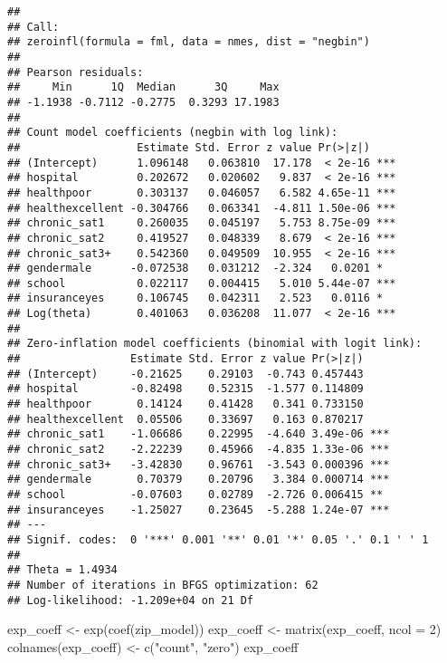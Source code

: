 \documentclass[
  oneside]{book}
\newenvironment{Shaded}{\begin{snugshade}}{\end{snugshade}}
\newcommand{\AttributeTok}[1]{\textcolor[rgb]{0.77,0.63,0.00}{#1}}
\newcommand{\DecValTok}[1]{\textcolor[rgb]{0.00,0.00,0.81}{#1}}
\newcommand{\FunctionTok}[1]{\textcolor[rgb]{0.00,0.00,0.00}{#1}}
\newcommand{\NormalTok}[1]{#1}
\newcommand{\OtherTok}[1]{\textcolor[rgb]{0.56,0.35,0.01}{#1}}
\newcommand{\StringTok}[1]{\textcolor[rgb]{0.31,0.60,0.02}{#1}}
\begin{document}
\begin{verbatim}
## 
## Call:
## zeroinfl(formula = fml, data = nmes, dist = "negbin")
## 
## Pearson residuals:
##     Min      1Q  Median      3Q     Max 
## -1.1938 -0.7112 -0.2775  0.3293 17.1983 
## 
## Count model coefficients (negbin with log link):
##                  Estimate Std. Error z value Pr(>|z|)    
## (Intercept)      1.096148   0.063810  17.178  < 2e-16 ***
## hospital         0.202672   0.020602   9.837  < 2e-16 ***
## healthpoor       0.303137   0.046057   6.582 4.65e-11 ***
## healthexcellent -0.304766   0.063341  -4.811 1.50e-06 ***
## chronic_sat1     0.260035   0.045197   5.753 8.75e-09 ***
## chronic_sat2     0.419527   0.048339   8.679  < 2e-16 ***
## chronic_sat3+    0.542360   0.049509  10.955  < 2e-16 ***
## gendermale      -0.072538   0.031212  -2.324   0.0201 *  
## school           0.022117   0.004415   5.010 5.44e-07 ***
## insuranceyes     0.106745   0.042311   2.523   0.0116 *  
## Log(theta)       0.401063   0.036208  11.077  < 2e-16 ***
## 
## Zero-inflation model coefficients (binomial with logit link):
##                 Estimate Std. Error z value Pr(>|z|)    
## (Intercept)     -0.21625    0.29103  -0.743 0.457443    
## hospital        -0.82498    0.52315  -1.577 0.114809    
## healthpoor       0.14124    0.41428   0.341 0.733150    
## healthexcellent  0.05506    0.33697   0.163 0.870217    
## chronic_sat1    -1.06686    0.22995  -4.640 3.49e-06 ***
## chronic_sat2    -2.22239    0.45966  -4.835 1.33e-06 ***
## chronic_sat3+   -3.42830    0.96761  -3.543 0.000396 ***
## gendermale       0.70379    0.20796   3.384 0.000714 ***
## school          -0.07603    0.02789  -2.726 0.006415 ** 
## insuranceyes    -1.25027    0.23645  -5.288 1.24e-07 ***
## ---
## Signif. codes:  0 '***' 0.001 '**' 0.01 '*' 0.05 '.' 0.1 ' ' 1 
## 
## Theta = 1.4934 
## Number of iterations in BFGS optimization: 62 
## Log-likelihood: -1.209e+04 on 21 Df
\end{verbatim}

\begin{Shaded}
\begin{Highlighting}[]
\NormalTok{exp\_coeff }\OtherTok{\textless{}{-}} \FunctionTok{exp}\NormalTok{(}\FunctionTok{coef}\NormalTok{(zip\_model))}
\NormalTok{exp\_coeff }\OtherTok{\textless{}{-}} \FunctionTok{matrix}\NormalTok{(exp\_coeff, }\AttributeTok{ncol =} \DecValTok{2}\NormalTok{)}
\FunctionTok{colnames}\NormalTok{(exp\_coeff) }\OtherTok{\textless{}{-}} \FunctionTok{c}\NormalTok{(}\StringTok{"count"}\NormalTok{, }\StringTok{"zero"}\NormalTok{)}
\NormalTok{exp\_coeff}
\end{Highlighting}
\end{Shaded}
\end{document}
